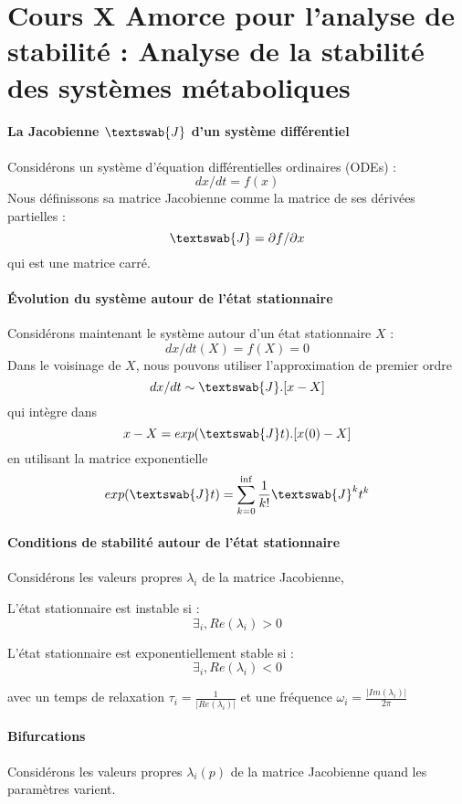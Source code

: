 
\renewcommand{\labelitemi}{$\bullet$}
\renewcommand{\labelitemii}{$\cdot$}
\renewcommand{\labelitemiii}{$\diamond$}
\renewcommand{\labelitemiv}{$\ast$}

\section{Cours X  Amorce pour l'analyse de stabilité : Analyse de la stabilité des systèmes métaboliques}

\paragraph{La Jacobienne $\textswab{J}$ d'un système différentiel}
Considérons un système d'équation différentielles ordinaires (ODEs) : 
$$ dx/dt = f(x) $$
Nous définissons sa matrice Jacobienne comme la matrice de ses dérivées partielles :
$$ \textswab{J} = \partial f / \partial x $$
qui est une matrice carré.


\paragraph{Évolution du système autour de l'état stationnaire}
Considérons maintenant le système autour d'un état stationnaire $X$ :
$$ dx/dt(X) = f(X)=0$$
Dans le voisinage de $X$, nous pouvons utiliser l'approximation de premier ordre
$$ dx/dt \sim \textswab{J} . [x-X] $$
qui intègre dans
$$ x-X = exp( \textswab{J}t) . [x(0)-X] $$
en utilisant la matrice exponentielle
$$ exp( \textswab{J}t) = \sum_{k=0}^{\inf} \frac{1}{k!} \textswab{J}^k t^k $$



\paragraph{Conditions de stabilité autour de l'état stationnaire}
Considérons les valeurs propres $\lambda_i$ de la matrice Jacobienne, 

L'état stationnaire est instable si : $$ \exists_i, Re(\lambda_i)>0 $$

L'état stationnaire est exponentiellement stable  si : $$ \exists_i, Re(\lambda_i)<0 $$

avec un temps de relaxation $\tau_i = \frac{1}{|Re(\lambda_i)|}$ 
et une fréquence $ \omega_i = \frac{|Im(\lambda_i)|}{2\pi} $



\paragraph{Bifurcations}
Considérons les valeurs propres $\lambda_i(p)$ de la matrice Jacobienne quand les paramètres varient.

